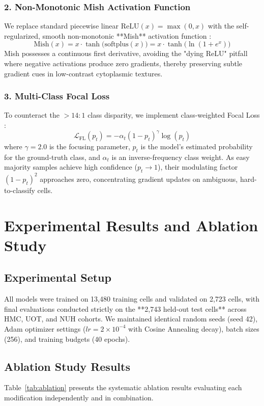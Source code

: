 \documentclass[a4paper,fleqn]{cas-sc}
\begin{document}
\subsubsection{2. Non-Monotonic Mish Activation Function}
We replace standard piecewise linear $\text{ReLU}(x) = \max(0, x)$ with the self-regularized, smooth non-monotonic **Mish** activation function \cite{misra2020mish}:
\begin{equation}
    \text{Mish}(x) = x \cdot \tanh\big(\text{softplus}(x)\big) = x \cdot \tanh\big(\ln(1 + e^x)\big)
\end{equation}
Mish possesses a continuous first derivative, avoiding the "dying ReLU" pitfall where negative activations produce zero gradients, thereby preserving subtle gradient cues in low-contrast cytoplasmic textures.

\subsubsection{3. Multi-Class Focal Loss}
To counteract the $>14:1$ class disparity, we implement class-weighted Focal Loss \cite{lin2017focal}:
\begin{equation}
    \mathcal{L}_{\text{FL}}(p_t) = -\alpha_t (1 - p_t)^\gamma \log(p_t)
\end{equation}
where $\gamma = 2.0$ is the focusing parameter, $p_t$ is the model's estimated probability for the ground-truth class, and $\alpha_t$ is an inverse-frequency class weight. As easy majority samples achieve high confidence ($p_t \rightarrow 1$), their modulating factor $(1 - p_t)^2$ approaches zero, concentrating gradient updates on ambiguous, hard-to-classify cells.

\section{Experimental Results and Ablation Study}
\subsection{Experimental Setup}
All models were trained on 13,480 training cells and validated on 2,723 cells, with final evaluations conducted strictly on the **2,743 held-out test cells** across HMC, UOT, and NUH cohorts. We maintained identical random seeds (seed 42), Adam optimizer settings ($lr = 2 \times 10^{-4}$ with Cosine Annealing decay), batch sizes (256), and training budgets (40 epochs).

\subsection{Ablation Study Results}
Table~\ref{tab:ablation} presents the systematic ablation results evaluating each modification independently and in combination.
\end{document}
